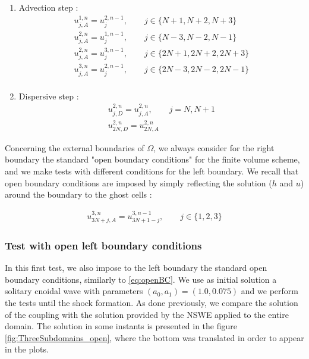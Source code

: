 \begin{enumerate}
	\item Advection step : 
		\begin{equation*}
			\begin{gathered}
				u^{1,n}_{j,A} = u^{2,n-1}_{j}, \qquad j \in \{N+1,N+2,N+3\} \\
				u^{2,n}_{j,A} = u^{1,n-1}_{j}, \qquad j \in \{N-3,N-2,N-1\} \\
				u^{2,n}_{j,A} = u^{3,n-1}_{j}, \qquad j \in \{2N+1,2N+2,2N+3\} \\
				u^{3,n}_{j,A} = u^{2,n-1}_{j}, \qquad j \in \{2N-3,2N-2,2N-1\} \\ 
			\end{gathered}
		\end{equation*}
	\item Dispersive step :
		\begin{equation}
			\label{eq:TBCSerre}
			\begin{gathered}
				u^{2,n}_{j,D} = u^{2,n}_{j,A}, \qquad j=N,N+1 \\ 
				u^{2,n}_{2N,D} = u^{2,n}_{2N,A}
			\end{gathered}
		\end{equation}
\end{enumerate} 

\indent Concerning the external boundaries of $\Omega$, we always consider for the right boundary the standard "open boundary conditions" for the finite volume scheme, and we make tests with different conditions for the left boundary. We recall that open boundary conditions are imposed by simply reflecting the solution ($h$ and $u$) around the boundary to the ghost cells : 

\begin{equation}
	\label{eq:openBC}
	\begin{gathered}
		u^{3,n}_{3N+j,A} = u^{3,n-1}_{3N+1-j}, \qquad j \in \{1,2,3\}
	\end{gathered}
\end{equation}

\subsubsection{Test with open left boundary conditions}

\indent In this first test, we also impose to the left boundary the standard open boundary conditions, similarly to \eqref{eq:openBC}. We use as initial solution a solitary cnoidal wave with parameters $(a_0,a_1) = (1.0,0.075)$ and we perform the tests until the shock formation. As done previously, we compare the solution of the coupling with the solution provided by the NSWE applied to the entire domain. The solution in some instants is presented in the figure \ref{fig:ThreeSubdomains_open}, where the bottom was translated in order to appear in the plots.

